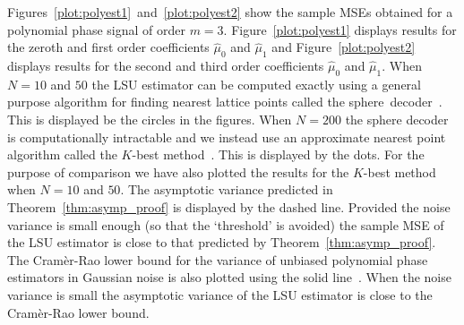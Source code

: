 \documentclass[aap]{imsart}
\begin{document}
Figures~\ref{plot:polyest1}~and~\ref{plot:polyest2} show the sample MSEs obtained for a polynomial phase signal of order $m=3$.  Figure~\ref{plot:polyest1} displays results for the zeroth and first order coefficients $\widehat{\mu}_0$ and $\widehat{\mu}_1$ and Figure~\ref{plot:polyest2} displays results for the second and third order coefficients $\widehat{\mu}_0$ and $\widehat{\mu}_1$.  When $N = 10$ and $50$ the LSU estimator can be computed exactly using a general purpose algorithm for finding nearest lattice points called the sphere~decoder~\cite{Pohst_sphere_decoder_1981,Agrell2002,Viterbo_sphere_decoder_1999}.  This is displayed be the circles in the figures.  When $N=200$ the sphere decoder is computationally intractable and we instead use an approximate nearest point algorithm called the $K$-best method~\cite{Zhan2006_K_best_sphere_decoder}.  This is displayed by the dots.  For the purpose of comparison we have also plotted the results for the $K$-best method when $N = 10$ and $50$.  The asymptotic variance predicted in Theorem~\ref{thm:asymp_proof} is displayed by the dashed line.  Provided the noise variance is small enough (so that the `threshold' is avoided) the sample MSE of the LSU estimator is close to that predicted by Theorem~\ref{thm:asymp_proof}.  The Cram\`{e}r-Rao lower bound for the variance of unbiased polynomial phase estimators in Gaussian noise is also plotted using the solid line~\cite{McKilliam_polycrbs_2012,Peleg1991_CRB_PPS_1991}.  When the noise variance is small the asymptotic variance of the LSU estimator is close to the Cram\`{e}r-Rao lower bound.  

\end{document}

